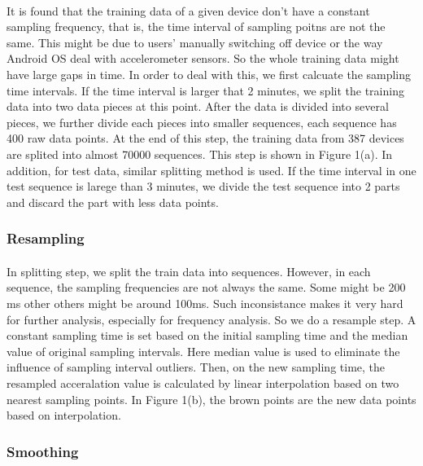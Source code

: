 \documentclass{article}
\begin{document}
		\paragraph{}It is found that the training data of a given device don't have a constant sampling frequency, that is, the time interval of sampling poitns are not the same. This might be due to users' manually switching off device or the way Android OS deal with accelerometer sensors. So the whole training data might have large gaps in time. In order to deal with this, we first calcuate the sampling time intervals. If the time interval is larger that 2 minutes, we split the training data into two data pieces at this point. After the data is divided into several pieces, we further divide each pieces into smaller sequences, each sequence has 400 raw data points. At the end of this step, the training data from 387 devices are splited into almost 70000 sequences. This step is shown in Figure 1(a).
		In addition, for test data, similar splitting method is used. If the time interval in one test sequence is larege than 3 minutes, we divide the test sequence into 2 parts and discard the part with less data points. 
		\subsubsection{Resampling}
		\paragraph{} In splitting step, we split the train data into sequences. However, in each sequence, the sampling frequencies are not always the same. Some might be 200 ms other others might be around 100ms.  Such inconsistance makes it very hard for further analysis, especially for frequency analysis. So we do a resample step. A constant sampling time is set based on the initial sampling time and the median value of original sampling intervals. Here median value is used to eliminate the influence of sampling interval outliers. Then, on the new sampling time, the resampled acceralation value is calculated by linear interpolation based on two nearest sampling points. In Figure 1(b), the brown points are the new data points based on interpolation. 
		\subsubsection{Smoothing}
\end{document}
